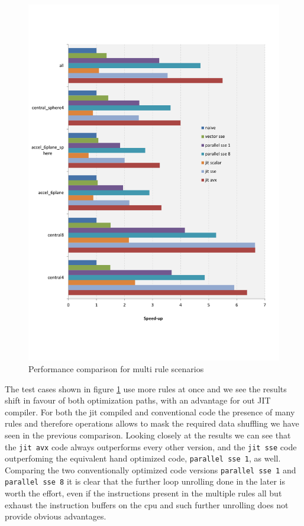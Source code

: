 \begin{figure}[th]\centering
  \includegraphics[scale=0.6]{multi_rules.pdf}
  \caption{Performance comparison for multi rule scenarios
  \label{perf_multi}}
\end{figure}

The test cases shown in figure \ref{perf_multi} use more rules at once and we see the results shift in favour of both optimization paths, with an advantage for out JIT compiler. For both the jit compiled and conventional code the presence of many rules and therefore operations allows to mask the required data shuffling we have seen in the previous comparison. Looking closely at the results we can see that the \texttt{jit avx} code always outperforms every other version, and the \texttt{jit sse} code outperfoming the equivalent hand optimized code, \texttt{parallel sse 1}, as well. Comparing the two conventionally optimized code versions \texttt{parallel sse 1} and \texttt{parallel sse 8} it is clear that the further loop unrolling done in the later is worth the effort, even if the instructions present in the multiple rules all but exhaust the instruction buffers on the cpu and such further unrolling does not provide obvious advantages.

